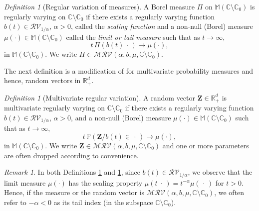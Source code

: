 \documentclass[aos]{imsart}
\numberwithin{equation}{section}
\theoremstyle{plain} %
\theoremstyle{remark}
\newtheorem{dfn}[theorem]{Definition}
\newtheorem{remark}[theorem]{Remark}
\newcommand{\C}{\mathbb{C}}
\newcommand{\M}{\mathbb{M}}
\renewcommand\P{\mathbb{P}}
\newcommand{\R}{\mathbb{R}}
\def\MRV{\mathcal{MRV}}
\def\RV{\mathcal{RV}}
\def\bZ{\boldsymbol Z}
\begin{document}
\begin{dfn}[Regular variation of measures]\label{def:mrvmeasure}
A Borel measure $\Pi$ on $\M(\mathbb{C}\setminus \mathbb{C}_0)$ is regularly varying on $\C\setminus\C_0$ if there exists
a regularly varying function $b(t) \in \RV_{1/\alpha}$,  $\alpha>0$, called the {\it scaling
  function\/} and a non-null (Borel) measure $\mu(\cdot)
\in \M(\mathbb{C}\setminus \mathbb{C}_0)$ called the {\it limit or tail measure\/} such that as $t \to\infty$,
\begin{equation}\label{eq:RegVarMeasure}
t\,\Pi( b(t) \,\cdot \,) \to \mu(\cdot),
\end{equation}
in $\M(\mathbb{C}
\setminus \mathbb{C}_0)$. %
 We write $\Pi \in \MRV(\alpha, b, \mu, \mathbb{C}
\setminus \mathbb{C}_0)$.
\end{dfn}
The next definition is a modification of  for multivariate probability measures and hence, random vectors in $\R^d_+$.
\begin{dfn}[Multivariate regular variation]\label{def:mrv}
A random vector $\bZ \in \R_{+}^{d}$ is multivariate regularly varying on $\mathbb{C}
\setminus \mathbb{C}_0$ if there exists a regularly varying function
$b(t) \in \RV_{1/\alpha}$, $\alpha >0$,  and a non-null (Borel) measure $\mu(\cdot)
\in \M(\mathbb{C}
\setminus \mathbb{C}_0)$ 
{such that} as $t \to\infty$,
\begin{equation}\label{eq:RegVarMeas}
t\,\P\left( \bZ/b(t) \in \,\cdot \,\right) \to \mu(\cdot),
\end{equation}
in $\M(\mathbb{C}
\setminus \mathbb{C}_0)$. We write $\bZ \in \MRV(\alpha, b, \mu, \mathbb{C}
\setminus \mathbb{C}_0)$ and one or more parameters are often dropped according to convenience.
\end{dfn}

\begin{remark}
In both Definitions \ref{def:mrvmeasure} and \ref{def:mrv},  since $b(t) \in \RV_{1/\alpha}$,
we observe that the limit measure $\mu(\cdot) $ has the scaling property 
$\mu(t \;\cdot\,) =t^{-\alpha} \mu(\,\cdot\,)$ for $t>0$. Hence, if the measure or the random vector is $\MRV(\alpha,b, \mu, \mathbb{C}
\setminus \mathbb{C}_0)$, we often refer to $-\alpha<0$ as its tail index (in the subspace $\mathbb{C}
\setminus \mathbb{C}_0$). 
\end{remark}
\end{document}
